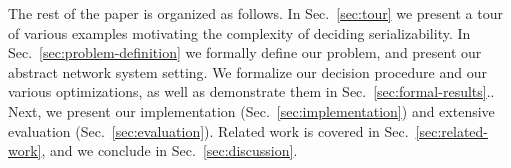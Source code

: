 The rest of the paper is organized as follows. In Sec.~\ref{sec:tour} we present a tour of various examples motivating the complexity of deciding serializability. In Sec.~\ref{sec:problem-definition} we formally define our problem, and present our abstract  network system setting. We formalize our decision procedure and our various optimizations, as well as demonstrate them in Sec.~\ref{sec:formal-results}.. Next, we present our implementation (Sec.~\ref{sec:implementation}) and extensive evaluation (Sec.~\ref{sec:evaluation}). 
Related work is covered in Sec.~\ref{sec:related-work}, and we conclude in Sec.~\ref{sec:discussion}.






